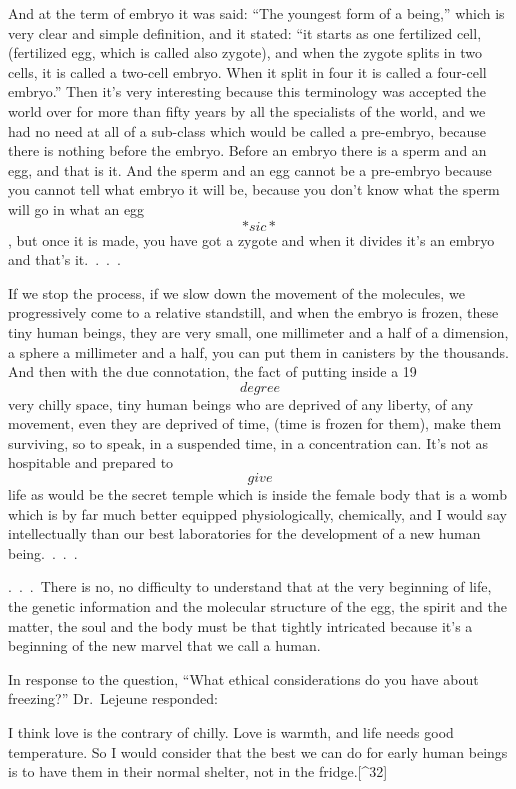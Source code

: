\documentclass[
]{book}
\begin{document}
And at the term of embryo it was said: ``The youngest form of a being,'' which is very clear and simple definition, and it stated: ``it starts as one fertilized cell, (fertilized egg, which is called also zygote), and when the zygote splits in two cells, it is called a two-cell embryo. When it split in four it is called a four-cell embryo.'' Then it's very interesting because this terminology was accepted the world over for more than fifty years by all the specialists of the world, and we had no need at all of a sub-class which would be called a pre-embryo, because there is nothing before the embryo. Before an embryo there is a sperm and an egg, and that is it. And the sperm and an egg cannot be a pre-embryo because you cannot tell what embryo it will be, because you don't know what the sperm will go in what an egg \[*sic*\], but once it is made, you have got a zygote and when it divides it's an embryo and that's it.~.~.~.

If we stop the process, if we slow down the movement of the molecules, we progressively come to a relative standstill, and when the embryo is frozen, these tiny human beings, they are very small, one millimeter and a half of a dimension, a sphere a millimeter and a half, you can put them in canisters by the thousands. And then with the due connotation, the fact of putting inside a 19 \[degree\] very chilly space, tiny human beings who are deprived of any liberty, of any movement, even they are deprived of time, (time is frozen for them), make them surviving, so to speak, in a suspended time, in a concentration can. It's not as hospitable and prepared to \[give\] life as would be the secret temple which is inside the female body that is a womb which is by far much better equipped physiologically, chemically, and I would say intellectually than our best laboratories for the development of a new human being.~.~.~.

.~.~.~There is no, no difficulty to understand that at the very beginning of life, the genetic information and the molecular structure of the egg, the spirit and the matter, the soul and the body must be that tightly intricated because it's a beginning of the new marvel that we call a human.

In response to the question, ``What ethical considerations do you have about freezing?'' Dr.~Lejeune responded:

I think love is the contrary of chilly. Love is warmth, and life needs good temperature. So I would consider that the best we can do for early human beings is to have them in their normal shelter, not in the fridge.{[}\^{}32{]}
\end{document}
